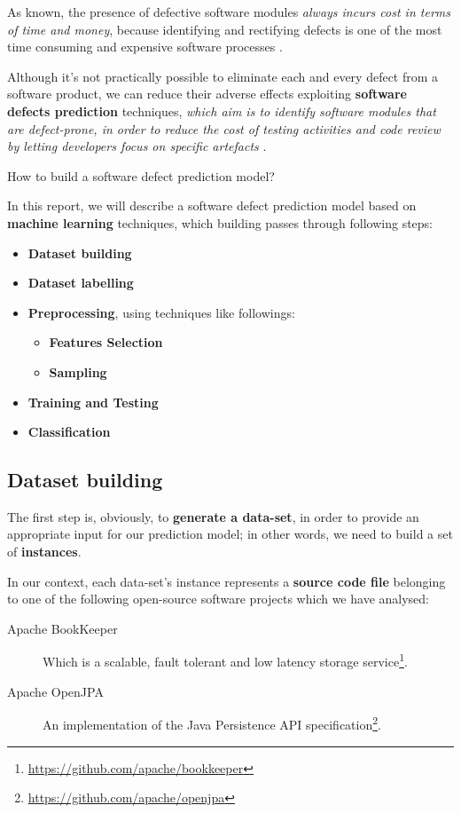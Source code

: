\documentclass[sigconf]{acmart}
\begin{document}
As known, the presence of defective software modules \textit{always incurs cost in terms of time and money}, because identifying and rectifying defects is one of the most time consuming and expensive software processes \cite{SoftwareDefectPredictionRawat}.

Although it's not practically possible to eliminate each and every defect from a software product, we can reduce their adverse effects exploiting \textbf{software defects prediction} techniques, \textit{which aim is to identify software modules that are defect-prone, in order to reduce the cost of testing activities and code review by letting developers focus on specific artefacts} \citep{Falessi}.

How to build a software defect prediction model? 

In this report, we will describe a software defect prediction model based on \textbf{machine learning} techniques, which building passes through following steps:

\begin{itemize}
\item \textbf{Dataset building}
\item \textbf{Dataset labelling}
\item \textbf{Preprocessing}, using techniques like followings: 
\begin{itemize}
\item \textbf{Features Selection}
\item \textbf{Sampling}
\end{itemize}

\item \textbf{Training and Testing}
\item \textbf{Classification}
\end{itemize}


\subsection{Dataset building}

The first step is, obviously, to \textbf{generate a data-set}, in order to provide an appropriate input for our prediction model; in other words, we need to build a set of \textbf{instances}. 

In our context, each data-set's instance represents a \textbf{source code file} belonging to one of the following open-source software projects which we have analysed:

\begin{description}
\item[Apache BookKeeper\texttrademark]Which is a scalable, fault tolerant and low latency storage service\footnote{\url{https://github.com/apache/bookkeeper}}.
\item[Apache OpenJPA\texttrademark]An implementation of the Java Persistence API specification\footnote{\url{https://github.com/apache/openjpa}}. 
\end{description}
\end{document}
